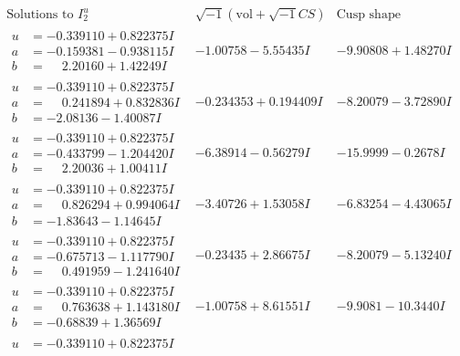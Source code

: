 \documentclass[1p]{elsarticle_modified}
\theoremstyle{definition}
\newcommand{\I}{\sqrt{-1}}
\begin{document}
$$\begin{array}{c|c|c}  
\text{Solutions to }I^u_{2}& \I (\text{vol} + \sqrt{-1}CS) & \text{Cusp shape}\\
 \hline 
\begin{aligned}
u &= -0.339110 + 0.822375 I \\
a &= -0.159381 - 0.938115 I \\
b &= \phantom{-}2.20160 + 1.42249 I\end{aligned}
 & -1.00758 - 5.55435 I & -9.90808 + 1.48270 I \\ \hline\begin{aligned}
u &= -0.339110 + 0.822375 I \\
a &= \phantom{-}0.241894 + 0.832836 I \\
b &= -2.08136 - 1.40087 I\end{aligned}
 & -0.234353 + 0.194409 I & -8.20079 - 3.72890 I \\ \hline\begin{aligned}
u &= -0.339110 + 0.822375 I \\
a &= -0.433799 - 1.204420 I \\
b &= \phantom{-}2.20036 + 1.00411 I\end{aligned}
 & -6.38914 - 0.56279 I & -15.9999 - 0.2678 I \\ \hline\begin{aligned}
u &= -0.339110 + 0.822375 I \\
a &= \phantom{-}0.826294 + 0.994064 I \\
b &= -1.83643 - 1.14645 I\end{aligned}
 & -3.40726 + 1.53058 I & -6.83254 - 4.43065 I \\ \hline\begin{aligned}
u &= -0.339110 + 0.822375 I \\
a &= -0.675713 - 1.117790 I \\
b &= \phantom{-}0.491959 - 1.241640 I\end{aligned}
 & -0.23435 + 2.86675 I & -8.20079 - 5.13240 I \\ \hline\begin{aligned}
u &= -0.339110 + 0.822375 I \\
a &= \phantom{-}0.763638 + 1.143180 I \\
b &= -0.68839 + 1.36569 I\end{aligned}
 & -1.00758 + 8.61551 I & -9.9081 - 10.3440 I \\ \hline\begin{aligned}
u &= -0.339110 + 0.822375 I \\

\end{aligned}
\end{array}$$
\end{document}
